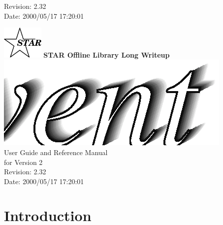 \documentclass[twoside]{article}
\begin{document}
  {\LARGE $ $Revision: 2.32 $ $}  \\[5mm] %
  {\LARGE $ $Date: 2000/05/17 17:20:01 $ $}  %
%
%
\begin{titlepage}
\pagestyle{empty}
\vspace*{-25mm}
\begin{center}
  \mbox{\includegraphics[width=2cm]{StarIcon.eps}}
  {\Large\bf STAR Offline Library Long Writeup}
  \hfill\mbox{}\\[3cm]
  \mbox{\includegraphics[width=\textwidth]{StEventTitle.eps}}
  \hfill\mbox{}\\[3cm]
  {\LARGE User Guide and Reference Manual \\[5mm] for Version 2}\\[2cm]
  {\LARGE $ $Revision: 2.32 $ $}  \\[5mm] %
  {\LARGE $ $Date: 2000/05/17 17:20:01 $ $}  %
  \vfill
\end{center}
\cleardoublepage
\end{titlepage}

%
%
\tableofcontents
\cleardoublepage

%
%

\section{Introduction} %
\end{document}
